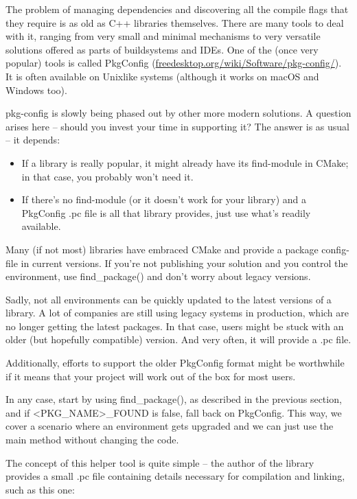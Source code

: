 The problem of managing dependencies and discovering all the compile flags that they require is as old as C++ libraries themselves. There are many tools to deal with it, ranging from very small and minimal mechanisms to very versatile solutions offered as parts of buildsystems and IDEs. One of the (once very popular) tools is called PkgConfig (\url{freedesktop.org/wiki/Software/pkg-config/}). It is often available on Unixlike systems (although it works on macOS and Windows too).

pkg-config is slowly being phased out by other more modern solutions. A question arises here – should you invest your time in supporting it? The answer is as usual – it depends:

\begin{itemize}
\item 
If a library is really popular, it might already have its find-module in CMake; in that case, you probably won't need it.

\item 
If there's no find-module (or it doesn't work for your library) and a PkgConfig .pc file is all that library provides, just use what's readily available.
\end{itemize}

Many (if not most) libraries have embraced CMake and provide a package config-file in current versions. If you're not publishing your solution and you control the environment, use find\_package() and don't worry about legacy versions.

Sadly, not all environments can be quickly updated to the latest versions of a library. A lot of companies are still using legacy systems in production, which are no longer getting the latest packages. In that case, users might be stuck with an older (but hopefully compatible) version. And very often, it will provide a .pc file.

Additionally, efforts to support the older PkgConfig format might be worthwhile if it means that your project will work out of the box for most users.

In any case, start by using find\_package(), as described in the previous section, and if <PKG\_NAME>\_FOUND is false, fall back on PkgConfig. This way, we cover a scenario where an environment gets upgraded and we can just use the main method without changing the code.

The concept of this helper tool is quite simple – the author of the library provides a small .pc file containing details necessary for compilation and linking, such as this one:


